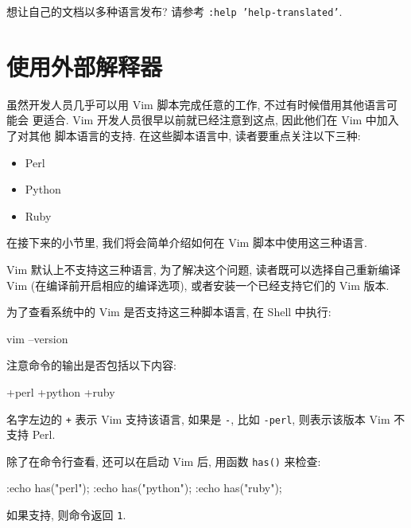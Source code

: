 \begin{vimcode}
	想让自己的文档以多种语言发布? 请参考 \texttt{:help 'help-translated'}.
\end{vimcode}

\section{使用外部解释器}
\label{sec:using_external_interpreters}

虽然开发人员几乎可以用 Vim 脚本完成任意的工作, 不过有时候借用其他语言可能会
更适合. Vim 开发人员很早以前就已经注意到这点, 因此他们在 Vim 中加入了对其他
脚本语言的支持. 在这些脚本语言中, 读者要重点关注以下三种:
\begin{itemize}
	\item Perl
	\item Python
	\item Ruby
\end{itemize}
在接下来的小节里, 我们将会简单介绍如何在 Vim 脚本中使用这三种语言.

Vim 默认上不支持这三种语言, 为了解决这个问题, 读者既可以选择自己重新编译
Vim (在编译前开启相应的编译选项), 或者安装一个已经支持它们的 Vim 版本.

为了查看系统中的 Vim 是否支持这三种脚本语言, 在 Shell 中执行:
\begin{vimcode}
vim --version
\end{vimcode}
注意命令的输出是否包括以下内容:
\begin{vimcode}
+perl
+python
+ruby
\end{vimcode}
名字左边的 \texttt{+} 表示 Vim 支持该语言, 如果是 \texttt{-}, 比如
\texttt{-perl}, 则表示该版本 Vim 不支持 Perl.

除了在命令行查看, 还可以在启动 Vim 后, 用函数 \texttt{has()} 来检查:
\begin{vimcode}
:echo has("perl");
:echo has("python");
:echo has("ruby");
\end{vimcode}
如果支持, 则命令返回 \texttt{1}.
